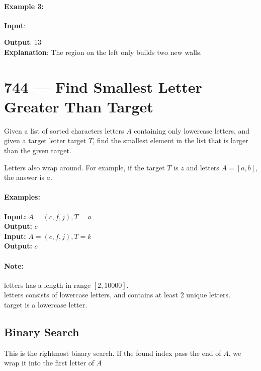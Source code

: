 \documentclass[a4paper,12pt]{article}
\begin{document}
\paragraph{Example 3:}
\begin{flushleft}
\textbf{Input}:
\begin{figure}[H]
\end{figure}
\textbf{Output}: 13
\\
\textbf{Explanation}: The region on the left only builds two new walls.
\end{flushleft}




\section{744 --- Find Smallest Letter Greater Than Target}
Given a list of sorted characters letters $A$ containing only lowercase letters, and given a target letter target $T$, find the smallest element in the list that is larger than the given target.
\par
Letters also wrap around. For example, if the target $T$ is $z$ and letters $A = [a, b]$, the answer is $a$.
\paragraph{Examples:}
\begin{flushleft}
\textbf{Input:} $A=(c,f,j), T=a$
\\
\textbf{Output:} $c$
\\
\textbf{Input:} $A=(c,f,j), T=k$
\\
\textbf{Output:} $c$
\end{flushleft}
\paragraph{Note:}
\begin{flushleft}
letters has a length in range $[2, 10000]$.
\\
letters consists of lowercase letters, and contains at least 2 unique letters.
\\
target is a lowercase letter.
\end{flushleft}
\subsection{Binary Search}
This is the rightmost binary search. If the found index pass the end of $A$, we wrap it into the first letter of $A$
\end{document}
